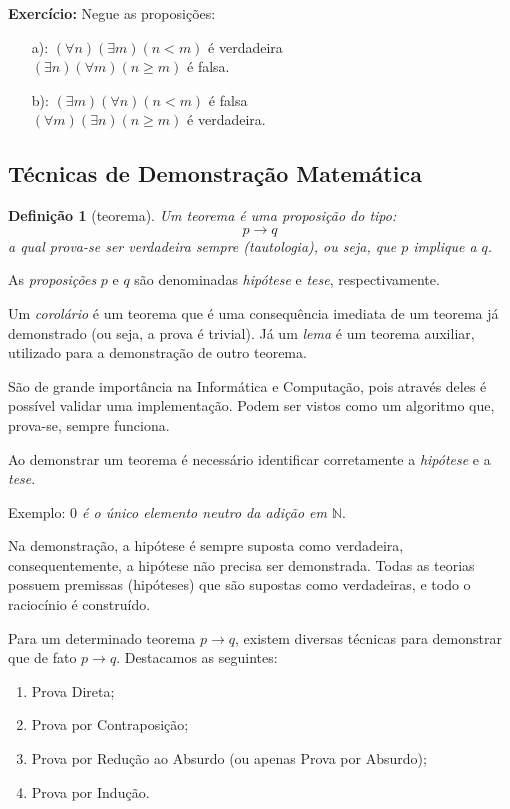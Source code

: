 \documentclass[oneside,a4paper,12pt]{article}
\newtheorem{definition}{Definição}[section]
\begin{document}
\textbf{Exercício:} Negue as proposições:
\begin{itemize}
	\item [a):] $(\forall n)(\exists m)(n<m)$ é verdadeira \\
				$(\exists n)(\forall m)(n\geq m)$ é falsa.
	\item [b):] $(\exists m)(\forall n)(n<m)$ é falsa \\
				$(\forall m)(\exists n)(n\geq m)$ é verdadeira.
\end{itemize}


\subsection{Técnicas de Demonstração Matemática}

\begin{definition}[teorema]
	Um {\it teorema} é uma proposição do tipo: $$ p \rightarrow q$$ a qual prova-se ser verdadeira sempre (tautologia), ou seja, que $p$ implique a $q$.
\end{definition}

As {\it proposições} $p$ e $q$ são denominadas {\it hipótese} e {\it tese}, respectivamente.

Um {\it corolário} é um teorema que é uma consequência imediata de um teorema já demonstrado (ou seja, a prova é trivial). Já um {\it lema} é um teorema auxiliar, utilizado para a demonstração de outro teorema.

São de grande importância na Informática e Computação, pois através deles é possível validar uma implementação. Podem ser vistos como um algoritmo que, prova-se, sempre funciona.

Ao demonstrar um teorema é necessário identificar corretamente a {\it hipótese} e a {\it tese}. 

Exemplo: {\it $0$ é o único elemento neutro da adição em $\mathbb{N}$}.

Na demonstração, a hipótese é sempre suposta como verdadeira, consequentemente, a hipótese não precisa ser demonstrada. Todas as teorias possuem premissas (hipóteses) que são supostas como verdadeiras, e todo o raciocínio é construído.

Para um determinado teorema $p \rightarrow q$, existem diversas técnicas para demonstrar que de fato $p \rightarrow q$. Destacamos as seguintes:
\begin{enumerate}
	\item Prova Direta;
	\item Prova por Contraposição;
	\item Prova por Redução ao Absurdo (ou apenas Prova por Absurdo);
	\item Prova por Indução.
\end{enumerate}
\end{document}
